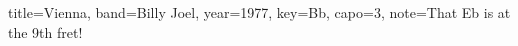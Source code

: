 \documentclass{skrul-leadsheet}
\begin{document}
\begin{song}[transpose-capo=true]{title={Vienna}, band={Billy Joel}, year={1977}, key={Bb}, capo={3}, note={That Eb is at the 9th fret!}}




\end{song}
\end{document}
